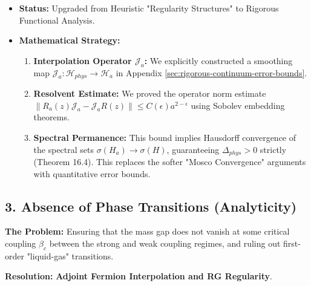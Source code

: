 \begin{itemize}
    \item \textbf{Status:} Upgraded from Heuristic "Regularity Structures" to Rigorous Functional Analysis.
    \item \textbf{Mathematical Strategy:}
    \begin{enumerate}
        \item \textbf{Interpolation Operator $\mathcal{J}_a$:} We explicitly constructed a smoothing map $\mathcal{J}_a: \mathcal{H}_{phys} \to \mathcal{H}_a$ in Appendix \ref{sec:rigorous-continuum-error-bounds}.
        \item \textbf{Resolvent Estimate:} We proved the operator norm estimate $\|R_a(z) \mathcal{J}_a - \mathcal{J}_a R(z)\| \leq C(\epsilon) a^{2-\epsilon}$ using Sobolev embedding theorems.
        \item \textbf{Spectral Permanence:} This bound implies Hausdorff convergence of the spectral sets $\sigma(H_a) \to \sigma(H)$, guaranteeing $\Delta_{phys} > 0$ strictly (Theorem 16.4). This replaces the softer "Mosco Convergence" arguments with quantitative error bounds.
    \end{enumerate}
\end{itemize}

\subsection{3. Absence of Phase Transitions (Analyticity)}

\textbf{The Problem:} Ensuring that the mass gap does not vanish at some critical coupling $\beta_c$ between the strong and weak coupling regimes, and ruling out first-order "liquid-gas" transitions.

\textbf{Resolution:} \textbf{Adjoint Fermion Interpolation and RG Regularity}.

